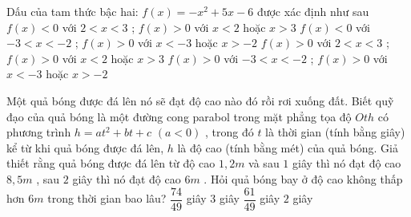 \begin{ex}%
Dấu của tam thức bậc hai: $f(x)=-x^2+5x-6$ được xác định như sau
\choice
{$f(x) < 0$ với $2 < x < 3$ ; $f(x) > 0$ với $x < 2$ hoặc $x > 3$}
{$f(x) < 0$ với $-3 < x <-2$ ; $f(x) > 0$ với $x <-3$ hoặc $x >-2$}
{\True $f(x) > 0$ với $2 < x < 3$ ; $f(x) > 0$ với $x < 2$ hoặc $x > 3$}
{$f(x) > 0$ với $-3 < x <-2$ ; $f(x) > 0$ với $x <-3$ hoặc $x >-2$}
\loigiai{
Xét $f(x)=0$ $\Leftrightarrow $ $\left[\begin{array}{l}
x=2\\
x=3
\end{array}\right.$ .\\
Bảng xét dấu:
\begin{center}
\begin{tikzpicture}[scale=1, font=\footnotesize, line join=round, line cap=round, >=stealth]
\tkzTabInit[nocadre=false,lgt=1.2,espcl=2,deltacl=0.6]
{$x$ /0.6,$f(x)$ /0.6}
{$-\infty$,$2$,$3$,$+\infty$}
\tkzTabLine{,-,0,+,0,-}
\end{tikzpicture}
\end{center}
Vậy $f(x) > 0$ với $2 < x < 3$ ; $f(x) > 0$ với $x < 2$ hoặc $x > 3$ .}
\end{ex}
%
\begin{ex}%
Một quả bóng được đá lên nó sẽ đạt độ cao nào đó rồi rơi xuống đất. Biết quỹ đạo của quả bóng là một đường cong parabol trong mặt phẳng tọa độ $Oth$ có phương trình $h=a{t^2}+bt+c$ $\left(a < 0\right)$ , trong đó $t$ là thời gian (tính bằng giây) kể từ khi quả bóng được đá lên, $h$ là độ cao (tính bằng mét) của quả bóng. Giả thiết rằng quả bóng được đá lên từ độ cao $1,2m$ và sau $1$ giây thì nó đạt độ cao $8,5m$ , sau $2$ giây thì nó đạt độ cao $6m$ . Hỏi quả bóng bay ở độ cao không thấp hơn $6m$ trong thời gian bao lâu?
\choice
{\True $\dfrac{74}{49}$ giây}
{$3$ giây}
{$\dfrac{61}{49}$ giây}
{$2$ giây}
\end{ex}

